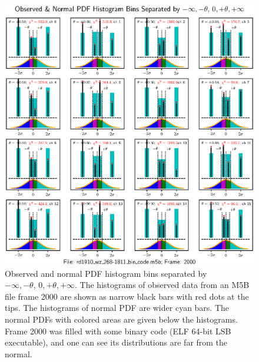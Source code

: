 \documentclass[letterpaper,twoside,12pt]{article}
\begin{document}
\begin{figure}[ht!]
  \begin{center}
  \includegraphics[width=40pc]{fig_4x4_Histograms_bin_code_inserted.eps}
  \caption{\small Observed and normal PDF histogram bins separated by $-\infty, -\theta, \, 0, +\theta, +\infty$. The histograms of observed data from an M5B file frame 2000 are shown as narrow black bars with red dots at the tips. The histograms of normal PDF are wider cyan bars. The normal PDFs with colored areas are given below the histograms. Frame 2000 was filled with some binary code (ELF 64-bit LSB executable), and one can see its distributions are far from the normal.}
  \label{hists_bin_code_4x4}
  \end{center}
\end{figure}
\end{document}
